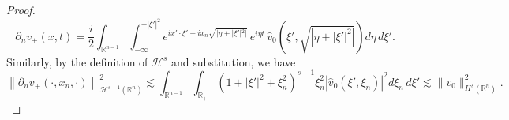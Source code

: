 \documentclass[preprint,compress,12pt]{elsarticle}
\numberwithin{equation}{section}
\begin{document}
\begin{proof}
	\begin{equation*}	\partial_{n}v_{+}(x,t)=\frac{i}{2}\int_{\mathbb{R}^{n-1}}\int_{-\infty}^{-|\xi'|^{2}}e^{ix'\cdot\xi'+i x_{n}\sqrt{|\eta+|\xi'|^{2}|}}\, e^{i\eta t} \, \widehat{v}_0(\xi',\sqrt{\left|\eta+|\xi'|^{2}\right|})d\eta\, d\xi'.
	\end{equation*}
	Similarly, by the definition of $\mathcal{H}^s$ and substitution, we have
	\begin{equation*} \left\|\partial_{n} v_{+}(\cdot,x_{n},\cdot)\right\|_{\mathcal{H}^{s-1}(\mathbb{R}^{n})}^{2}
		\lesssim \int_{\mathbb{R}^{n-1}}\int_{\mathbb{R}_{+}}\left(1+|\xi'|^2+\xi_{n}^{2}\right)^{s-1}\xi_{n}^{2}\left|\widehat{v}_0(\xi',\xi_{n})\right|^2d\xi_{n}\, d\xi'
		\lesssim \|v_{0}\|_{H^{s}(\mathbb{R}^{n})}^{2}.
	\end{equation*}
\end{proof}
\end{document}
